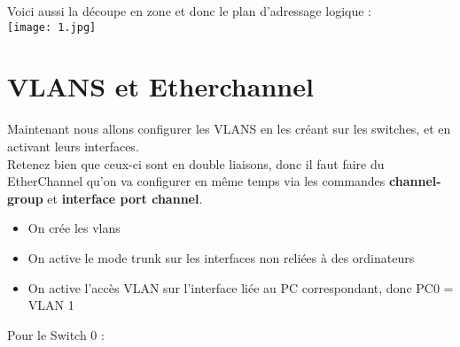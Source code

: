 \documentclass[a4paper,10pt,final,fleqn]{article}
\begin{document}
	Voici aussi la découpe en zone et donc le plan d'adressage logique : \\

	\texttt{[image: 1.jpg]}\\

\section{VLANS et Etherchannel}

	Maintenant nous allons configurer les VLANS en les créant sur les switches, et en activant leurs interfaces.\\
	Retenez bien que ceux-ci sont en double liaisons, donc il faut faire du EtherChannel qu'on va configurer en même temps via les commandes \textbf{channel-group} et \textbf{interface port channel}.\\

	\begin{itemize}
		\item On crée les vlans
		\item On active le mode trunk sur les interfaces non reliées à des ordinateurs
		\item On active l'accès VLAN sur l'interface liée au PC correspondant, donc PC0 = VLAN 1\\
	\end{itemize}

	Pour le Switch 0 : \\
\end{document}
